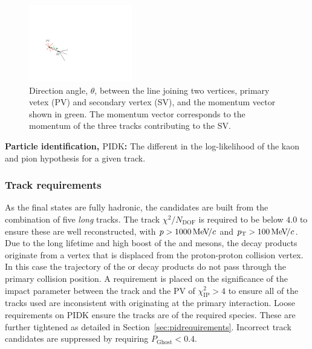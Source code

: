 \begin{description}
\begin{figure}[!h]
    \centering
    \includegraphics[width=0.4\textwidth]{figs/Selection/DIRA.pdf}
    \caption{Direction angle, $\theta$, between the line joining two vertices, primary vetex (PV) and secondary vertex (SV), and the momentum vector shown in green. The momentum vector corresponds to the momentum of the three tracks contributing to the SV. }
    \label{fig:dira}   
\end{figure}


\item \textbf{Particle identification, $\text{PIDK}$:} The different in the log-likelihood of the kaon and pion hypothesis for a given track.  
\end{description}


\subsubsection{Track requirements}
As the final states are fully hadronic, the candidates are built from the combination of five \emph{long} tracks.  
The track $\chi^{2}/N_{\text{DOF}}$ is required to be below $4.0$ to ensure these are well reconstructed, with $\mbox{$p$} > 1000 {\mathrm{\,Me\kern -0.1em V\!/}c}$ and $\mbox{$p_{\mathrm{ T}}$} > 100 {\mathrm{\,Me\kern -0.1em V\!/}c}$.
Due to the long lifetime and high boost of the \Bp and \D mesons, the decay products originate from a vertex that is displaced from the proton-proton collision vertex. In this case the trajectory of the \Bp or \D decay products do not pass through the primary collision position. A requirement is placed on the significance of the impact parameter between the track and the PV of $\chi^{2}_{\text{IP}} > 4$ to ensure all of the tracks used are inconsistent with originating at the primary interaction.  
Loose requirements on PIDK ensure the tracks are of the required species. These are further tightened as detailed in Section~\ref{sec:pidrequirements}. Incorrect track candidates are suppressed by requiring $P_{\text{Ghost}}<0.4$. 


